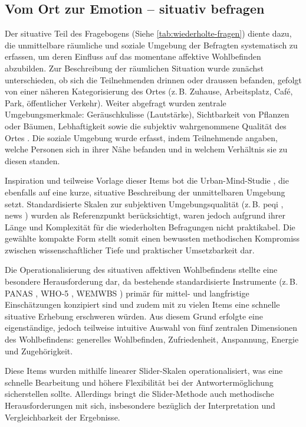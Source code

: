 \subsection{Vom Ort zur Emotion – situativ befragen}

Der situative Teil des Fragebogens (Siehe \cref{tab:wiederholte-fragen}) diente dazu, die unmittelbare räumliche und soziale Umgebung der Befragten systematisch zu erfassen, um deren Einfluss auf das momentane affektive Wohlbefinden abzubilden. Zur Beschreibung der räumlichen Situation wurde zunächst unterschieden, ob sich die Teilnehmenden drinnen oder draussen befanden, gefolgt von einer näheren Kategorisierung des Ortes (z.\,B. Zuhause, Arbeitsplatz, Café, Park, öffentlicher Verkehr). Weiter abgefragt wurden zentrale Umgebungsmerkmale: Geräuschkulisse (Lautstärke), Sichtbarkeit von Pflanzen oder Bäumen, Lebhaftigkeit sowie die subjektiv wahrgenommene Qualität des Ortes . Die soziale Umgebung wurde erfasst, indem Teilnehmende angaben, welche Personen sich in ihrer Nähe befanden und in welchem Verhältnis sie zu diesen standen.

Inspiration und teilweise Vorlage dieser Items bot die Urban-Mind-Studie \parencite{bakolisUrbanMindUsing2018}, die ebenfalls auf eine kurze, situative Beschreibung der unmittelbaren Umgebung setzt. Standardisierte Skalen zur subjektiven Umgebungsqualität (z.\,B. \acrfull{peqi} \parencite{bonaiutoPerceivedResidentialEnvironment2015}, \acrfull{news} \parencite{saelensNeighborhoodEnvironmentWalkability2018}) wurden als Referenzpunkt berücksichtigt, waren jedoch aufgrund ihrer Länge und Komplexität für die wiederholten Befragungen nicht praktikabel. Die gewählte kompakte Form stellt somit einen bewussten methodischen Kompromiss zwischen wissenschaftlicher Tiefe und praktischer Umsetzbarkeit dar.

Die Operationalisierung des situativen affektiven Wohlbefindens stellte eine besondere Herausforderung dar, da bestehende standardisierte Instrumente (z.\,B. PANAS \parencite{yountMeasuringMoodComparison2023}, WHO-5 \parencite{toppWHO5WellBeingIndex2015}, WEMWBS \parencite{tennantWarwickEdinburghMentalWellbeing2007}) primär für mittel- und langfristige Einschätzungen konzipiert sind und zudem mit zu vielen Items eine schnelle situative Erhebung erschweren würden. Aus diesem Grund erfolgte eine eigenständige, jedoch teilweise intuitive Auswahl von fünf zentralen Dimensionen des Wohlbefindens: generelles Wohlbefinden, Zufriedenheit, Anspannung, Energie und Zugehörigkeit.

Diese Items wurden mithilfe linearer Slider-Skalen operationalisiert, was eine schnelle Bearbeitung und höhere Flexibilität bei der Antwortermöglichung sicherstellen sollte. Allerdings bringt die Slider-Methode auch methodische Herausforderungen mit sich, insbesondere bezüglich der Interpretation und Vergleichbarkeit der Ergebnisse.

